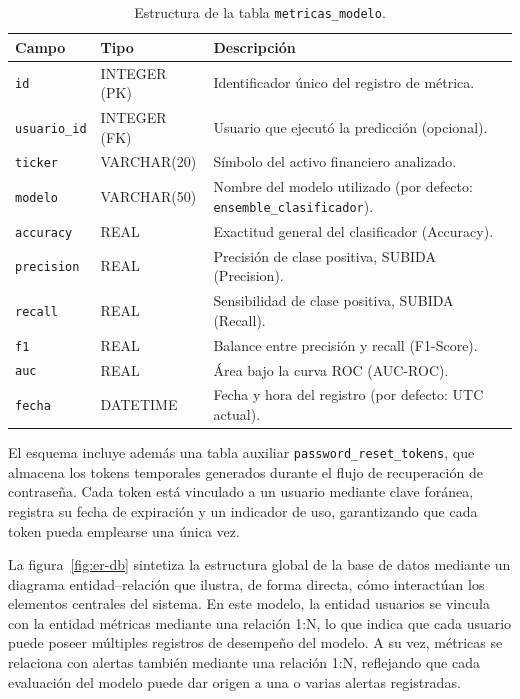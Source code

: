 \begin{table}[h]
\centering
\caption{Estructura de la tabla \texttt{metricas\_modelo}.}
\label{tab:metricas}
\begin{tabular}{lll}
\toprule
\textbf{Campo} & \textbf{Tipo} & \textbf{Descripción} \\
\midrule
\texttt{id}           & INTEGER (PK)   & Identificador único del registro de métrica. \\
\texttt{usuario\_id}  & INTEGER (FK)   & Usuario que ejecutó la predicción (opcional). \\
\texttt{ticker}       & VARCHAR(20)    & Símbolo del activo financiero analizado. \\
\texttt{modelo}       & VARCHAR(50)    & Nombre del modelo utilizado (por defecto: \texttt{ensemble\_clasificador}). \\
\texttt{accuracy}     & REAL           & Exactitud general del clasificador (Accuracy). \\
\texttt{precision}    & REAL           & Precisión de clase positiva, SUBIDA (Precision). \\
\texttt{recall}       & REAL           & Sensibilidad de clase positiva, SUBIDA (Recall). \\
\texttt{f1}           & REAL           & Balance entre precisión y recall (F1-Score). \\
\texttt{auc}          & REAL           & Área bajo la curva ROC (AUC-ROC). \\
\texttt{fecha}        & DATETIME       & Fecha y hora del registro (por defecto: UTC actual). \\
\bottomrule
\end{tabular}
\end{table}

El esquema incluye además una tabla auxiliar \texttt{password\_reset\_tokens},
que almacena los tokens temporales generados durante el flujo de recuperación
de contraseña. Cada token está vinculado a un usuario mediante clave foránea,
registra su fecha de expiración y un indicador de uso, garantizando que cada
token pueda emplearse una única vez.




La figura~\ref{fig:er-db} sintetiza la estructura global de la base de datos mediante un diagrama entidad–relación que ilustra, de forma directa, cómo interactúan los elementos centrales del sistema. En este modelo, la entidad usuarios se vincula con la entidad métricas mediante una relación 1:N, lo que indica que cada usuario puede poseer múltiples registros de desempeño del modelo. A su vez, métricas se relaciona con alertas también mediante una relación 1:N, reflejando que cada evaluación del modelo puede dar origen a una o varias alertas registradas.

